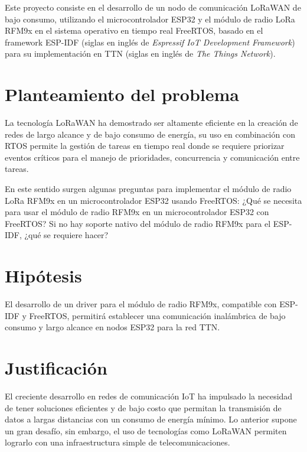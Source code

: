 \vspace{0.5cm}

Este proyecto consiste en el desarrollo de un nodo de comunicación LoRaWAN  de bajo consumo, utilizando el microcontrolador ESP32 y el módulo de radio LoRa RFM9x en el sistema operativo en tiempo real FreeRTOS, basado en el framework ESP-IDF (siglas en inglés de \textit{Espressif IoT Development Framework}) para su implementación en TTN (siglas en inglés de \textit{The Things Network}).

\section{Planteamiento del problema}

La tecnología LoRaWAN ha demostrado ser altamente eficiente en la creación de redes de largo alcance y de bajo consumo de energía, su uso en combinación con RTOS permite la gestión de tareas en tiempo real donde se requiere priorizar eventos críticos para el manejo de prioridades, concurrencia y comunicación entre tareas.

\vspace{0.5cm}

En este sentido surgen algunas preguntas para implementar el módulo de radio LoRa RFM9x en un microcontrolador ESP32 usando FreeRTOS: ¿Qué se necesita para usar el módulo de radio RFM9x en un microcontrolador ESP32 con FreeRTOS? Si no hay soporte nativo del módulo de radio RFM9x para el ESP-IDF, ¿qué se requiere hacer?

\section{Hipótesis}

El desarrollo de un driver para el módulo de radio RFM9x, compatible con ESP-IDF y FreeRTOS, permitirá establecer una comunicación inalámbrica de bajo consumo y largo alcance en nodos ESP32 para la red TTN.

\section{Justificación}

El creciente desarrollo en redes de comunicación IoT ha impulsado la necesidad de tener soluciones eficientes y de bajo costo que permitan la transmisión de datos a largas distancias con un consumo de energía mínimo. Lo anterior supone un gran desafío, sin embargo, el uso de tecnologías como LoRaWAN permiten lograrlo con una infraestructura simple de telecomunicaciones.

